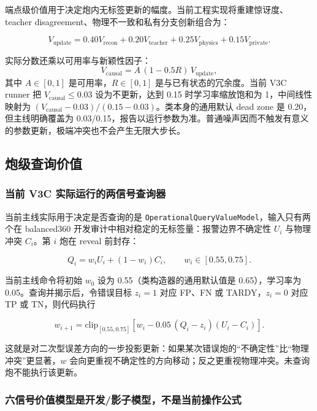 \documentclass[11pt,a4paper]{article}
\newcommand{\code}[1]{\texttt{\small #1}}
\begin{document}
端点级价值用于决定炮内无标签更新的幅度。当前工程实现将重建惊讶度、teacher disagreement、物理不一致和私有分支创新组合为：

\begin{equation}
V_{\mathrm{update}}
=0.40V_{\mathrm{recon}}
 +0.20V_{\mathrm{teacher}}
 +0.25V_{\mathrm{physics}}
 +0.15V_{\mathrm{private}}.
\label{eq:update-value}
\end{equation}

实际分数还乘以可用率与新颖性因子：
\[
V_{\mathrm{causal}}
=A\,(1-0.5R)\,V_{\mathrm{update}},
\]
其中 \(A\in[0,1]\) 是可用率，\(R\in[0,1]\) 是与已有状态的冗余度。当前 V3C runner 把 \(V_{\mathrm{causal}}\leq0.03\) 设为不更新，达到 0.15 时学习率缩放饱和为 1，中间线性映射为 \((V_{\mathrm{causal}}-0.03)/(0.15-0.03)\)。类本身的通用默认 dead zone 是 0.20，但主线明确覆盖为 0.03/0.15，报告以运行参数为准。普通噪声因而不触发有意义的参数更新，极端冲突也不会产生无限大步长。

\subsection{炮级查询价值}

\subsubsection{当前 V3C 实际运行的两信号查询器}

当前主线实际用于决定是否查询的是 \code{OperationalQueryValueModel}，输入只有两个在 balanced360 开发审计中相对稳定的无标签量：报警边界不确定性 \(U_i\) 与物理冲突 \(C_i\)。第 \(i\) 炮在 reveal 前封存：

\begin{equation}
Q_i=w_iU_i+(1-w_i)C_i,\qquad w_i\in[0.55,0.75].
\label{eq:operational-query}
\end{equation}

当前主线命令将初始 \(w_0\) 设为 0.55（类构造器的通用默认值是 0.65），学习率为 0.05。查询并揭示后，令错误目标 \(z_i=1\) 对应 FP、FN 或 TARDY，\(z_i=0\) 对应 TP 或 TN，则代码执行

\[
w_{i+1}=\mathrm{clip}_{[0.55,0.75]}
\left[w_i-0.05\,(Q_i-z_i)(U_i-C_i)\right].
\]

这就是对二次型误差方向的一步投影更新：如果某次错误炮的“不确定性”比“物理冲突”更显著，\(w\) 会向更重视不确定性的方向移动；反之更重视物理冲突。未查询炮不能执行该更新。

\subsubsection{六信号价值模型是开发/影子模型，不是当前操作公式}
\end{document}
